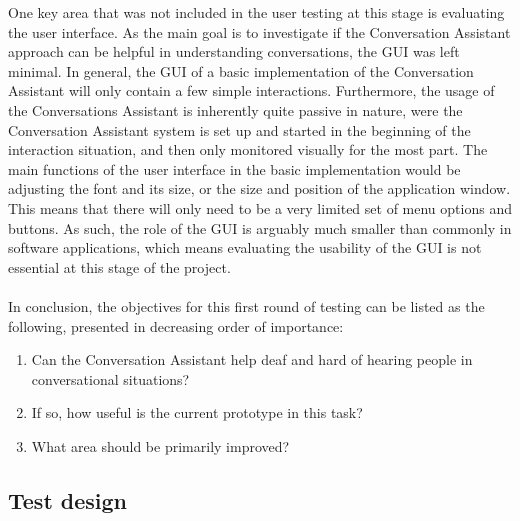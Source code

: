\documentclass[english, 12pt, a4paper, pdftex, elec, utf8]{aaltothesis}
\begin{document}
One key area that was not included in the user testing at this stage is evaluating the user interface. As the main goal is to investigate if the Conversation Assistant approach can be helpful in understanding conversations, the GUI was left minimal. In general, the GUI of a basic implementation of the Conversation Assistant will only contain a few simple interactions. Furthermore, the usage of the Conversations Assistant is inherently quite passive in nature, were the Conversation Assistant system is set up and started in the beginning of the interaction situation, and then only monitored visually for the most part. The main functions of the user interface in the basic implementation would be adjusting the font and its size, or the size and position of the application window. This means that there will only need to be a very limited set of menu options and buttons. As such, the role of the GUI is arguably much smaller than commonly in software applications, which means evaluating the usability of the GUI is not essential at this stage of the project. \\\\
In conclusion, the objectives for this first round of testing can be listed as the following, presented in decreasing order of importance:
\vspace{1mm}
\begin{enumerate}[itemsep=2mm]
    \item Can the Conversation Assistant help deaf and hard of hearing people in \\ conversational situations?
    \item If so, how useful is the current prototype in this task?
    \item What area should be primarily improved?
\end{enumerate}
\vspace{1mm}

\subsection{Test design} \label{sec:testdesign}
\end{document}
